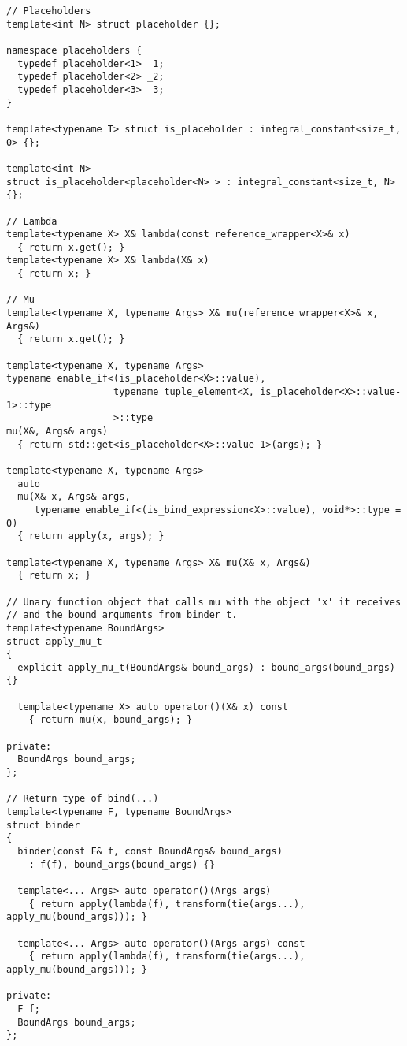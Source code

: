 \documentclass{article}
\begin{document}
\small
\begin{verbatim}
// Placeholders
template<int N> struct placeholder {};

namespace placeholders {
  typedef placeholder<1> _1;
  typedef placeholder<2> _2;
  typedef placeholder<3> _3;
}

template<typename T> struct is_placeholder : integral_constant<size_t, 0> {};

template<int N> 
struct is_placeholder<placeholder<N> > : integral_constant<size_t, N> {};

// Lambda
template<typename X> X& lambda(const reference_wrapper<X>& x)
  { return x.get(); }
template<typename X> X& lambda(X& x)
  { return x; }

// Mu
template<typename X, typename Args> X& mu(reference_wrapper<X>& x, Args&)
  { return x.get(); }

template<typename X, typename Args>
typename enable_if<(is_placeholder<X>::value),
                   typename tuple_element<X, is_placeholder<X>::value-1>::type
                   >::type
mu(X&, Args& args)
  { return std::get<is_placeholder<X>::value-1>(args); }

template<typename X, typename Args>
  auto 
  mu(X& x, Args& args, 
     typename enable_if<(is_bind_expression<X>::value), void*>::type = 0)
  { return apply(x, args); }

template<typename X, typename Args> X& mu(X& x, Args&)
  { return x; }

// Unary function object that calls mu with the object 'x' it receives
// and the bound arguments from binder_t.
template<typename BoundArgs>
struct apply_mu_t
{
  explicit apply_mu_t(BoundArgs& bound_args) : bound_args(bound_args) {}

  template<typename X> auto operator()(X& x) const
    { return mu(x, bound_args); }

private:
  BoundArgs bound_args;
};

// Return type of bind(...)
template<typename F, typename BoundArgs>
struct binder
{
  binder(const F& f, const BoundArgs& bound_args)
    : f(f), bound_args(bound_args) {}

  template<... Args> auto operator()(Args args)
    { return apply(lambda(f), transform(tie(args...), apply_mu(bound_args))); }

  template<... Args> auto operator()(Args args) const
    { return apply(lambda(f), transform(tie(args...), apply_mu(bound_args))); }

private:
  F f;
  BoundArgs bound_args;
};


\end{verbatim}
\end{document}
